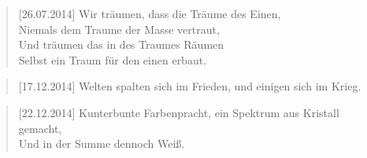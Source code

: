 \begin{quotes}[Zitate 1]

\begin{quote}[26.07.2014]
Wir träumen, dass die Träume des Einen,\\
Niemals dem Traume der Masse vertraut,\\
Und träumen das in des Traumes Räumen\\
Selbst ein Traum für den einen erbaut.
    \end{quote}

    \begin{quote}[17.12.2014]
Welten spalten sich im Frieden, und einigen sich im Krieg.
    \end{quote}



    \begin{quote}[22.12.2014]
Kunterbunte Farbenpracht, ein Spektrum aus Kristall gemacht,\\
Und in der Summe dennoch Weiß.
    \end{quote}

\end{quotes}